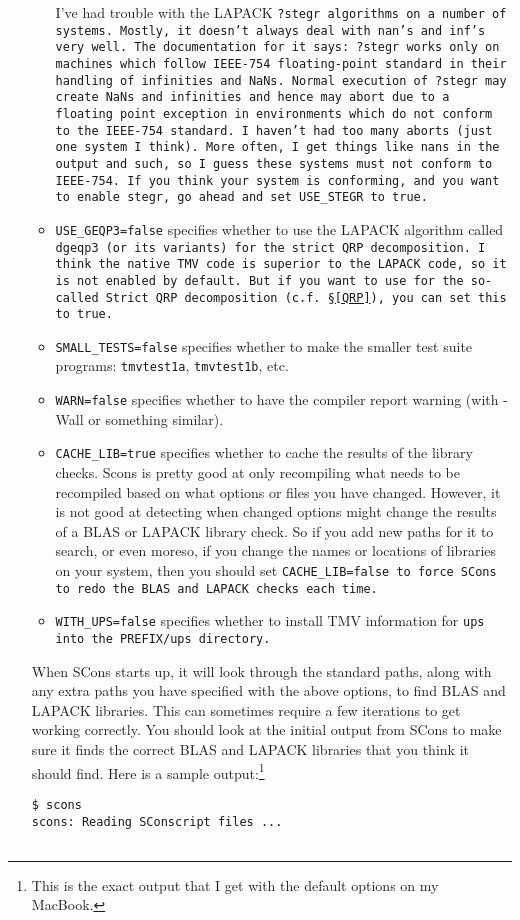 \begin{enumerate}
\begin{itemize}
I've had trouble with the LAPACK \tt{?stegr} algorithms on a number of systems.  Mostly, it doesn't always deal with \tt{nan}'s and \tt{inf}'s very well.  The documentation for it says:
{\sc ?stegr works only on machines which follow IEEE-754 floating-point standard in their handling of infinities and NaNs. Normal execution of ?stegr may create NaNs and infinities and hence may abort due to a floating point exception in environments which do not conform to the IEEE-754 standard.}  I haven't had too many aborts (just one system I think).  More often, I get things like \tt{nan}s in the output and such, so I guess these systems must not conform to IEEE-754.  If you think your system is conforming, and you want to enable \tt{stegr}, go ahead and set \tt{USE_STEGR} to \tt{true}.
\item
\texttt{USE\_GEQP3=false} specifies whether to use the LAPACK algorithm called
\tt{dgeqp3} (or its variants) for the strict QRP decomposition.  I think the native TMV code is superior to the LAPACK code, so it is not enabled by default.  But if you want to use for the so-called Strict QRP decomposition (c.f. \S\ref{QRP}), you can set this to \tt{true}.
\item \texttt{SMALL\_TESTS=false} specifies whether to make the smaller test suite programs: \texttt{tmvtest1a}, \texttt{tmvtest1b}, etc. 
\item \texttt{WARN=false} specifies whether to have the compiler report warning (with -Wall or
something similar).
\item \texttt{CACHE\_LIB=true} specifies whether to cache the results of the library checks.  
Scons is pretty good at only recompiling what needs to be recompiled based on what options or files you have changed.  However, it is not good at detecting when changed options might change the results of a BLAS or LAPACK library check.  So if you add new paths for it to search, or even moreso, if you change the names or locations of libraries on your system, then you should set \tt{CACHE\_LIB=false} to force SCons to redo the BLAS and LAPACK checks each time.
\item \texttt{WITH\_UPS=false} specifies whether to install TMV information for \tt{ups} into the \tt{PREFIX/ups} directory.
\end{itemize}

When SCons starts up, it will look through the standard paths, along with any extra paths you have
specified with the above options, to find BLAS
and LAPACK libraries.  This can sometimes require a few iterations to get working correctly.  
You should look at the initial output from SCons to make sure it finds the correct BLAS
and LAPACK libraries that you think it should find.  Here is a sample output:\footnote{
This is the exact output that I get with the default options on my MacBook.}
\begin{verbatim}
$ scons
scons: Reading SConscript files ...


\end{verbatim}
\end{enumerate}
